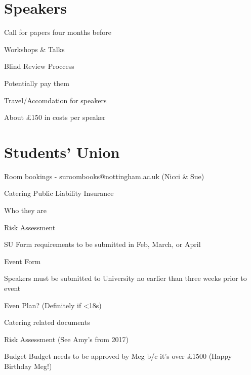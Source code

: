 \documentclass[11pt,hacksoc]{meetingmins}
\begin{document}
\section{Speakers}
\begin{items}
\item
Call for papers four months before

	\subitem
	Workshops \& Talks
	
	\subitem
	Blind Review Proccess

\item
Potentially pay them

\item
Travel/Accomdation for speakers

\item
About \pounds150 in costs per speaker
	
\end{items}

\section{Students' Union}
\begin{items}

\item
Room bookings - suroombooks@nottingham.ac.uk (Nicci \& Sue)
	\subitem

\item
Catering
	\subitem
	Public Liability Insurance
	
	\subitem
	Who they are
	
	\subitem
	Risk Assessment
	

\item
SU Form requirements to be submitted in Feb, March, or April


\item
Event Form
	\subitem
	
	\subitem
	Speakers must be submitted to University no earlier than three weeks prior to event
	
\item
Even Plan? (Definitely if <18s)
	
\item
Catering related documents
	
\item
Risk Assessment (See Amy's from 2017)
	\subitem
		
\item
Budget
	\subitem
	Budget needs to be approved by Meg b/c it's over \pounds1500 (Happy Birthday Meg!)

	\subitem
	
	\subitem

\end{items}

\vspace{1em}
\end{document}
